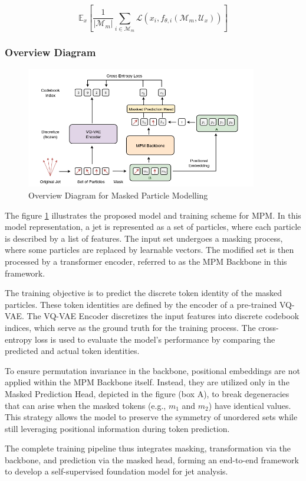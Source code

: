 \documentclass[letterpaper,12pt]{article}
\newcommand{\la}{\mathcal{L}}
\newcommand{\ma}{\mathcal{M}}
\newcommand{\ua}{\mathcal{U}}
\begin{document}
\begin{spacing}{1.125}
    $$ \mathbb{E}_x \left[ \frac{1}{|\ma_m|} \sum_{i\in \ma_m} \la(x_i,
    f_{\theta,i}(\ma_m, \ua_x)) \right] $$

\subsubsection{Overview Diagram}

\begin{figure}[!htb]
  \includegraphics[width=0.9\textwidth]{overview.png}
  \caption{Overview Diagram for Masked Particle Modelling}
  \label{overview}
\end{figure}

The figure \ref{overview} illustrates the proposed model and training scheme for
MPM. In this model representation, a jet is represented as a set of particles, where each particle is described by a list of features. The input set undergoes a masking process, where some particles are replaced by learnable vectors. The modified set is then processed by a transformer encoder, referred to as the MPM Backbone in this framework.

The training objective is to predict the discrete token identity of the masked particles. These token identities are defined by the encoder of a pre-trained VQ-VAE. The VQ-VAE Encoder discretizes the input features into discrete codebook indices, which serve as the ground truth for the training process. The cross-entropy loss is used to evaluate the model's performance by comparing the predicted and actual token identities.

To ensure permutation invariance in the backbone, positional embeddings are not
applied within the MPM Backbone itself. Instead, they are utilized only in the
Masked Prediction Head, depicted in the figure (box A), to break degeneracies
that can arise when the masked tokens (e.g., $m_1$ and $m_2$) have identical values. This strategy allows the model to preserve the symmetry of unordered sets while still leveraging positional information during token prediction.

The complete training pipeline thus integrates masking, transformation via the backbone, and prediction via the masked head, forming an end-to-end framework to develop a self-supervised foundation model for jet analysis.

\end{spacing}
\end{document}

